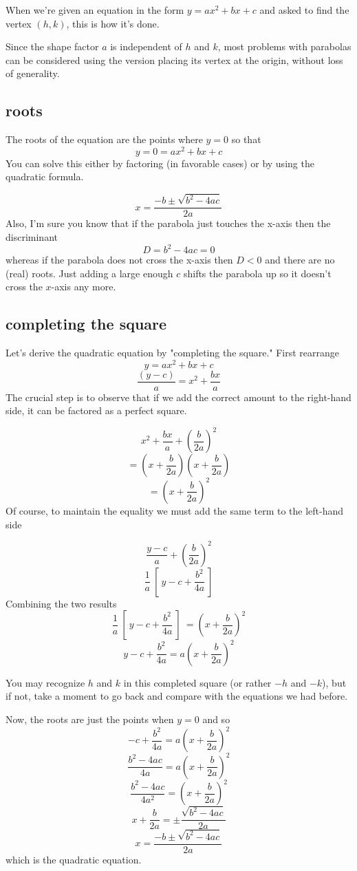 \documentclass[11pt, oneside]{article}
\begin{document}
When we're given an equation in the form $y = ax^2 + bx + c$ and asked to find the vertex $(h,k)$, this is how it's done.

Since the shape factor $a$ is independent of $h$ and $k$, most problems with parabolas can be considered using the version placing its vertex at the origin, without loss of generality.
\subsection*{roots}
The roots of the equation are the points where $y = 0$ so that
\[ y = 0 = ax^2 + bx + c \]
You can solve this either by factoring (in favorable cases) or by using the quadratic formula.

\[ x = \frac{-b \pm \sqrt{b^2 - 4ac}}{2a} \] 
Also, I'm sure you know that if the parabola just touches the x-axis then the discriminant 
\[ D = b^2 - 4ac = 0 \]
whereas if the parabola does not cross the x-axis then $D<0$ and there are no (real) roots.  Just adding a large enough $c$ shifts the parabola up so it doesn't cross the $x$-axis any more.

\hypertarget{completing_the_square}{}
\subsection*{completing the square}

Let's derive the quadratic equation by "completing the square."  First rearrange
\[ y = ax^2 + bx + c \]
\[ \frac{(y-c)}{a} = x^2 + \frac{bx}{a} \]
The crucial step is to observe that if we add the correct amount to the right-hand side, it can be factored as a perfect square.

\[ x^2 + \frac{bx}{a} + (\frac{b}{2a})^2 \]
\[ = (x + \frac{b}{2a})(x + \frac{b}{2a}) \]
\[ = (x + \frac{b}{2a})^2 \]
Of course, to maintain the equality we must add the same term to the left-hand side

\[ \frac{y-c}{a} + (\frac{b}{2a})^2 \]
\[ \frac{1}{a} \ [ \ y - c + \frac{b^2}{4a} \ ] \]
Combining the two results
\[ \frac{1}{a} \ [ \ y - c + \frac{b^2}{4a} \ ] \ = (x + \frac{b}{2a})^2 \] 
\[ y-c + \frac{b^2}{4a} = a(x + \frac{b}{2a})^2 \]

You may recognize $h$ and $k$ in this completed square (or rather $-h$ and $-k$), but if not, take a moment to go back and compare with the equations we had before.  

Now, the roots are just the points when $y=0$ and so
\[  -c + \frac{b^2}{4a} = a(x + \frac{b}{2a})^2 \]
\[  \frac{b^2 -4ac}{4a} = a(x + \frac{b}{2a})^2 \]
\[  \frac{b^2-4ac}{4a^2} = (x + \frac{b}{2a})^2 \]
\[  x + \frac{b}{2a} = \pm \frac{\sqrt{b^2-4ac}}{2a}  \]
\[  x = \frac{-b \pm \sqrt{b^2-4ac}}{2a} \]
which is the quadratic equation.
\end{document}
